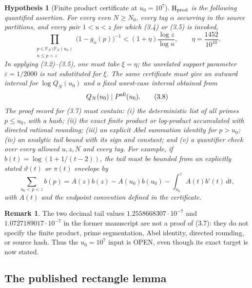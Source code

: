 \documentclass[11pt]{article}
\newtheorem{hypothesis}[theorem]{Hypothesis}
\theoremstyle{definition}
\newtheorem{remark}[theorem]{Remark}
\newcommand{\eps}{\varepsilon}
\newcommand{\openstatus}{\textcolor{red!75!black}{OPEN}}
\begin{document}
\begin{hypothesis}[Finite product certificate at \(u_0=10^7\)]
\label{hyp:prod}
\(\mathrm{H}_{\rm prod}\) is the following quantified assertion.  For every
even \(N\ge N_0\), every tag \(\alpha\) occurring in the source partitions,
and every pair \(1<u<z\) for which (3.4) or (3.5) is invoked,
\[
 \prod_{\substack{p\in\mathbb P_N\setminus\mathbb P_N(u_0)\\u\le p<z}}
 \bigl(1-g_\alpha(p)\bigr)^{-1}
 <(1+\eta)\frac{\log z}{\log u},
 \qquad \eta=\frac{1452}{10^{10}}.
\tag{3.7}
\]
In applying (3.2)--(3.5), one must take \(\xi=\eta\); the unrelated
support parameter \(\eps=1/2000\) is not substituted for \(\xi\).
The same certificate must give an outward interval for
\(\log Q_N(u_0)\) and a fixed worst-case interval obtained from
\[
 Q_N(u_0)\mid P^{\rm all}(u_0).
\tag{3.8}
\]
The proof record for (3.7) must contain: (i) the deterministic list of all
primes \(p\le u_0\), with a hash; (ii) the exact finite product or
log-product accumulated with directed rational rounding; (iii) an explicit
Abel summation identity for \(p>u_0\); (iv) an analytic tail bound with its
sign and constant; and (v) a quantifier check over every allowed \(u,z,N\)
and every tag.  For example, if
\(b(t)=\log(1+1/(t-2))\), the tail must be bounded from an explicitly
stated \(\vartheta(t)\) or \(\pi(t)\) envelope by
\[
 \sum_{u_0<p<z}b(p)
 =A(z)b(z)-A(u_0)b(u_0)
 -\int_{u_0}^{z}A(t)b'(t)\,dt,
\tag{3.9}
\]
with \(A(t)\) and the endpoint convention defined in the certificate.
\end{hypothesis}

\begin{remark}
The two decimal tail values \(1.2558668307\cdot10^{-7}\) and
\(1.0727189017\cdot10^{-7}\) in the former manuscript are not a proof of
(3.7): they do not specify the finite product, prime segmentation, Abel
identity, directed rounding, or source hash.  Thus the \(u_0=10^7\) input is
\openstatus, even though its exact target is now stated.
\end{remark}

\subsection{The published rectangle lemma}
\label{sec:bjs-rectangle}
\end{document}
